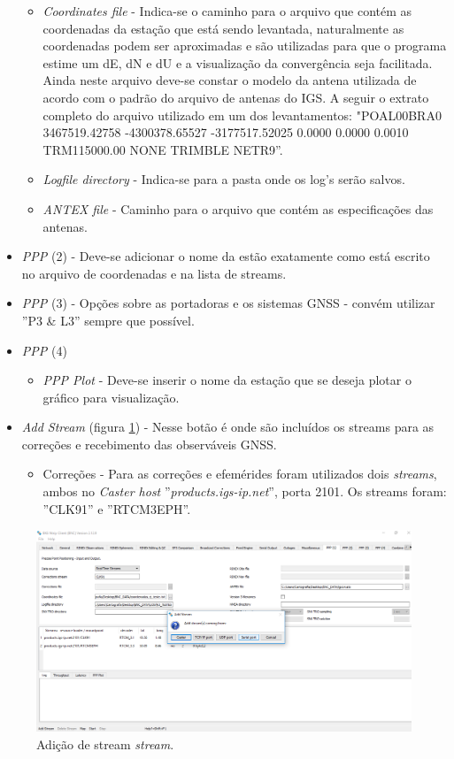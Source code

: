 \begin{itemize}
\begin{itemize}
        \item \textit{Coordinates file} - Indica-se o caminho para o arquivo que contém as coordenadas da estação que está sendo levantada, naturalmente as coordenadas podem ser aproximadas e são utilizadas para que o programa estime um dE, dN e dU e a visualização da convergência seja facilitada. Ainda neste arquivo deve-se constar o modelo da antena utilizada de acordo com o padrão do arquivo de antenas do IGS. A seguir o extrato completo do arquivo utilizado em um dos levantamentos: "POAL00BRA0  3467519.42758  -4300378.65527  -3177517.52025  0.0000  0.0000  0.0010 TRM115000.00    NONE TRIMBLE NETR9''.
        \item \textit{Logfile directory} - Indica-se para a pasta onde os log's serão salvos.
        \item \textit{ANTEX file} - Caminho para o arquivo que contém as especificações das antenas.
    \end{itemize}
    \item \textit{PPP} (2) -  Deve-se adicionar o nome da estão exatamente como está escrito no arquivo de coordenadas e na lista de streams.
    \item \textit{PPP} (3) - Opções sobre as portadoras e os sistemas GNSS - convém utilizar ''P3 \& L3'' sempre que possível.
    \item \textit{PPP} (4)
    \begin{itemize}
        \item \textit{PPP Plot} - Deve-se inserir o nome da estação que se deseja plotar o gráfico para visualização.
    \end{itemize}
    \item \textit{Add Stream} (figura \ref{add_stream}) - Nesse botão é onde são incluídos os streams para as correções e recebimento das observáveis GNSS.
    \begin{itemize}
        \item Correções - Para as correções e efemérides foram utilizados dois \textit{streams}, ambos no \textit{Caster host} ''\textit{products.igs-ip.net}'', porta 2101. Os streams foram: ''CLK91'' e ''RTCM3EPH''.
    \end{itemize}
\end{itemize}

\begin{figure}[H]
\centering
\includegraphics[scale=0.4]{img/BNC_18.png} %
\caption{Adição de stream \textit{stream}.}
\label{add_stream}
\end{figure}

